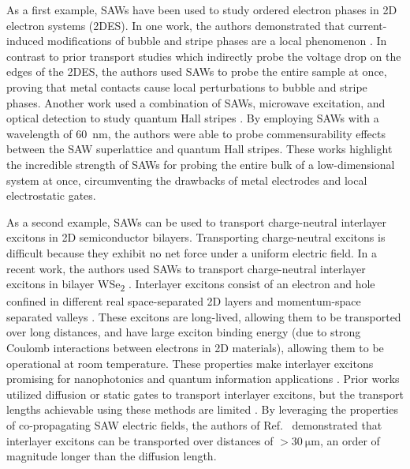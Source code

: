 \documentclass[double,12pt,1in,seploa]{beavtex}
\begin{document}
As a first example, SAWs have been used to study ordered electron phases in 2D electron systems (2DES). In one work, the authors demonstrated that current-induced modifications of bubble and stripe phases are a local phenomenon \cite{friess_current_2018}. In contrast to prior transport studies which indirectly probe the voltage drop on the edges of the 2DES, the authors used SAWs to probe the entire sample at once, proving that metal contacts cause local perturbations to bubble and stripe phases. Another work used a combination of SAWs, microwave excitation, and optical detection to study quantum Hall stripes \cite{kukushkin_collective_2011}. By employing SAWs with a wavelength of \SI{60}{\nano\meter}, the authors were able to probe commensurability effects between the SAW superlattice and quantum Hall stripes. These works highlight the incredible strength of SAWs for probing the entire bulk of a low-dimensional system at once, circumventing the drawbacks of metal electrodes and local electrostatic gates. 

As a second example, SAWs can be used to transport charge-neutral interlayer excitons in 2D semiconductor bilayers. Transporting charge-neutral excitons is difficult because they exhibit no net force under a uniform electric field. In a recent work, the authors used SAWs to transport charge-neutral interlayer excitons in bilayer WSe\textsubscript{2} \cite{peng_long-range_2022}. Interlayer excitons consist of an electron and hole confined in different real space-separated 2D layers and momentum-space separated valleys \cite{rivera_interlayer_2018}. These excitons are long-lived, allowing them to be transported over long distances, and have large exciton binding energy (due to strong Coulomb interactions between electrons in 2D materials), allowing them to be operational at room temperature. These properties make interlayer excitons promising for nanophotonics and quantum information applications \cite{kuznetsova_all-optical_2010, tran_evidence_2019, liu_electrically_2020}. Prior works utilized diffusion or static gates to transport interlayer excitons, but the transport lengths achievable using these methods are limited \cite{jauregui_electrical_2019,unuchek_room-temperature_2018, liu_electrically_2020}. By leveraging the properties of co-propagating SAW electric fields, the authors of Ref.\ \cite{peng_long-range_2022} demonstrated that interlayer excitons can be transported over distances of $> \SI{30}{\micro\meter}$, an order of magnitude longer than the diffusion length. 
\end{document}
